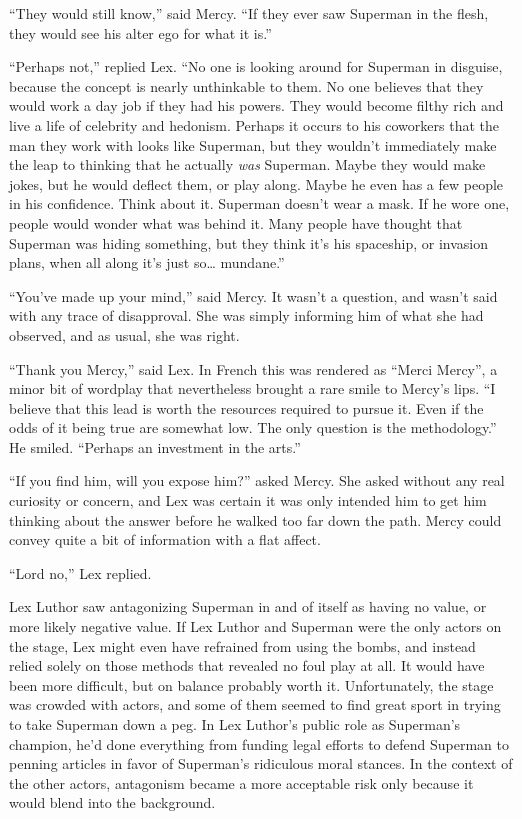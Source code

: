 \documentclass[ebook,12pt]{memoir}
\begin{document}
``They would still know,'' said Mercy. ``If they ever saw Superman in
the flesh, they would see his alter ego for what it is.''

``Perhaps not,'' replied Lex. ``No one is looking around for Superman in
disguise, because the concept is nearly unthinkable to them. No one
believes that they would work a day job if they had his powers. They
would become filthy rich and live a life of celebrity and hedonism.
Perhaps it occurs to his coworkers that the man they work with looks
like Superman, but they wouldn't immediately make the leap to thinking
that he actually \emph{was} Superman. Maybe they would make jokes, but
he would deflect them, or play along. Maybe he even has a few people in
his confidence. Think about it. Superman doesn't wear a mask. If he wore
one, people would wonder what was behind it. Many people have thought
that Superman was hiding something, but they think it's his spaceship,
or invasion plans, when all along it's just so\ldots{} mundane.''

``You've made up your mind,'' said Mercy. It wasn't a question, and
wasn't said with any trace of disapproval. She was simply informing him
of what she had observed, and as usual, she was right.

``Thank you Mercy,'' said Lex. In French this was rendered as ``Merci
Mercy'', a minor bit of wordplay that nevertheless brought a rare smile
to Mercy's lips. ``I believe that this lead is worth the resources
required to pursue it. Even if the odds of it being true are somewhat
low. The only question is the methodology.'' He smiled. ``Perhaps an
investment in the arts.''

``If you find him, will you expose him?'' asked Mercy. She asked without
any real curiosity or concern, and Lex was certain it was only intended
him to get him thinking about the answer before he walked too far down
the path. Mercy could convey quite a bit of information with a flat
affect.

``Lord no,'' Lex replied.

Lex Luthor saw antagonizing Superman in and of itself as having no
value, or more likely negative value. If Lex Luthor and Superman were
the only actors on the stage, Lex might even have refrained from using
the bombs, and instead relied solely on those methods that revealed no
foul play at all. It would have been more difficult, but on balance
probably worth it. Unfortunately, the stage was crowded with actors, and
some of them seemed to find great sport in trying to take Superman down
a peg. In Lex Luthor's public role as Superman's champion, he'd done
everything from funding legal efforts to defend Superman to penning
articles in favor of Superman's ridiculous moral stances. In the context
of the other actors, antagonism became a more acceptable risk only
because it would blend into the background.
\end{document}

